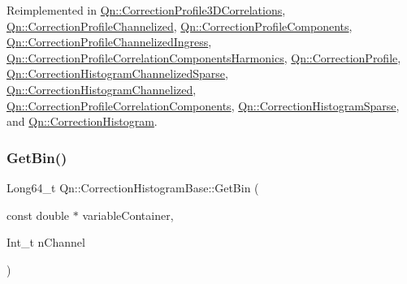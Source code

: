 Reimplemented in \mbox{\hyperlink{classQn_1_1CorrectionProfile3DCorrelations_ad0e08d2b05447c1dbd10f2a8b55b840a}{Qn\+::\+Correction\+Profile3\+D\+Correlations}}, \mbox{\hyperlink{classQn_1_1CorrectionProfileChannelized_aa495dacf1deb21e799a08afbefd323a3}{Qn\+::\+Correction\+Profile\+Channelized}}, \mbox{\hyperlink{classQn_1_1CorrectionProfileComponents_a379eff8f5c5b741e41fb70354a665ae2}{Qn\+::\+Correction\+Profile\+Components}}, \mbox{\hyperlink{classQn_1_1CorrectionProfileChannelizedIngress_a2716e7f057235fecd959ca967c29fd63}{Qn\+::\+Correction\+Profile\+Channelized\+Ingress}}, \mbox{\hyperlink{classQn_1_1CorrectionProfileCorrelationComponentsHarmonics_a51113d377e95ddd78f89adb9c2cd52df}{Qn\+::\+Correction\+Profile\+Correlation\+Components\+Harmonics}}, \mbox{\hyperlink{classQn_1_1CorrectionProfile_a23eab8b418467aa8dc9ff6d590acd5c0}{Qn\+::\+Correction\+Profile}}, \mbox{\hyperlink{classQn_1_1CorrectionHistogramChannelizedSparse_aadda1224f18ee306c731f78855c3b3b0}{Qn\+::\+Correction\+Histogram\+Channelized\+Sparse}}, \mbox{\hyperlink{classQn_1_1CorrectionHistogramChannelized_ac0f40b2e62be4290571d9f55fb900058}{Qn\+::\+Correction\+Histogram\+Channelized}}, \mbox{\hyperlink{classQn_1_1CorrectionProfileCorrelationComponents_a0e45d5f8e12af86c557aad48e07198a4}{Qn\+::\+Correction\+Profile\+Correlation\+Components}}, \mbox{\hyperlink{classQn_1_1CorrectionHistogramSparse_aea9b7cdd8ad93d5fb14c00b20848dcdc}{Qn\+::\+Correction\+Histogram\+Sparse}}, and \mbox{\hyperlink{classQn_1_1CorrectionHistogram_ac67e334f0d4bae4c45727e129c9bfba1}{Qn\+::\+Correction\+Histogram}}.

\mbox{\label{classQn_1_1CorrectionHistogramBase_acfde166908e4da950470841f21f87fb9}} 
\subsubsection{\texorpdfstring{Get\+Bin()}{GetBin()}\hspace{0.1cm}{\footnotesize\ttfamily [2/2]}}
{\footnotesize\ttfamily Long64\+\_\+t Qn\+::\+Correction\+Histogram\+Base\+::\+Get\+Bin (\begin{DoxyParamCaption}\item[{const double $\ast$}]{variable\+Container,  }\item[{Int\+\_\+t}]{n\+Channel }\end{DoxyParamCaption})\hspace{0.3cm}{\ttfamily [virtual]}}

